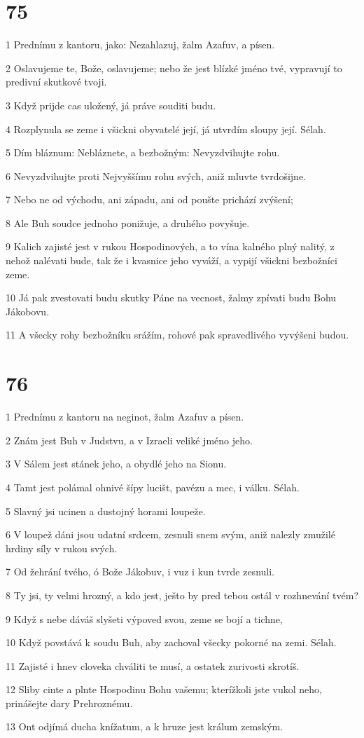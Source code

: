\chapter{75}

\par 1 Prednímu z kantoru, jako: Nezahlazuj, žalm Azafuv, a písen.
\par 2 Oslavujeme te, Bože, oslavujeme; nebo že jest blízké jméno tvé, vypravují to predivní skutkové tvoji.
\par 3 Když prijde cas uložený, já práve souditi budu.
\par 4 Rozplynula se zeme i všickni obyvatelé její, já utvrdím sloupy její. Sélah.
\par 5 Dím bláznum: Nebláznete, a bezbožným: Nevyzdvihujte rohu.
\par 6 Nevyzdvihujte proti Nejvyššímu rohu svých, aniž mluvte tvrdošijne.
\par 7 Nebo ne od východu, ani západu, ani od poušte prichází zvýšení;
\par 8 Ale Buh soudce jednoho ponižuje, a druhého povyšuje.
\par 9 Kalich zajisté jest v rukou Hospodinových, a to vína kalného plný nalitý, z nehož nalévati bude, tak že i kvasnice jeho vyváží, a vypijí všickni bezbožníci zeme.
\par 10 Já pak zvestovati budu skutky Páne na vecnost, žalmy zpívati budu Bohu Jákobovu.
\par 11 A všecky rohy bezbožníku srážím, rohové pak spravedlivého vyvýšeni budou.

\chapter{76}

\par 1 Prednímu z kantoru na neginot, žalm Azafuv a písen.
\par 2 Znám jest Buh v Judstvu, a v Izraeli veliké jméno jeho.
\par 3 V Sálem jest stánek jeho, a obydlé jeho na Sionu.
\par 4 Tamt jest polámal ohnivé šípy lucišt, pavézu a mec, i válku. Sélah.
\par 5 Slavný jsi ucinen a dustojný horami loupeže.
\par 6 V loupež dáni jsou udatní srdcem, zesnuli snem svým, aniž nalezly zmužilé hrdiny síly v rukou svých.
\par 7 Od žehrání tvého, ó Bože Jákobuv, i vuz i kun tvrde zesnuli.
\par 8 Ty jsi, ty velmi hrozný, a kdo jest, ješto by pred tebou ostál v rozhnevání tvém?
\par 9 Když s nebe dáváš slyšeti výpoved svou, zeme se bojí a tichne,
\par 10 Když povstává k soudu Buh, aby zachoval všecky pokorné na zemi. Sélah.
\par 11 Zajisté i hnev cloveka chváliti te musí, a ostatek zurivosti skrotíš.
\par 12 Sliby cinte a plnte Hospodinu Bohu vašemu; kterížkoli jste vukol neho, prinášejte dary Prehroznému.
\par 13 Ont odjímá ducha knížatum, a k hruze jest králum zemským.

